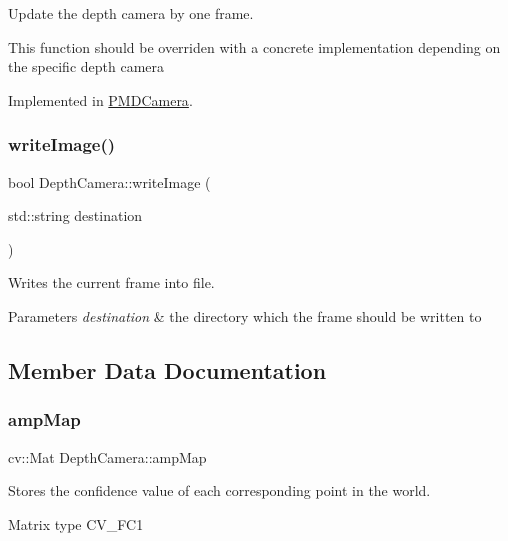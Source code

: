 Update the depth camera by one frame. 

This function should be overriden with a concrete implementation depending on the specific depth camera 

Implemented in \hyperlink{class_p_m_d_camera_aa6cb9398f9635436b4384ee2043def40}{P\+M\+D\+Camera}.

\hypertarget{class_depth_camera_a599dceaab9e673762b9ab76cf1e4f413}{}\label{class_depth_camera_a599dceaab9e673762b9ab76cf1e4f413} 
\subsubsection{\texorpdfstring{write\+Image()}{writeImage()}}
{\footnotesize\ttfamily bool Depth\+Camera\+::write\+Image (\begin{DoxyParamCaption}\item[{std\+::string}]{destination }\end{DoxyParamCaption})}



Writes the current frame into file. 


\begin{DoxyParams}{Parameters}
{\em destination} & the directory which the frame should be written to \\
\hline
\end{DoxyParams}


\subsection{Member Data Documentation}
\hypertarget{class_depth_camera_a067d5cd9eedcdaa95cc440e7381fdb9c}{}\label{class_depth_camera_a067d5cd9eedcdaa95cc440e7381fdb9c} 
\subsubsection{\texorpdfstring{amp\+Map}{ampMap}}
{\footnotesize\ttfamily cv\+::\+Mat Depth\+Camera\+::amp\+Map\hspace{0.3cm}{\ttfamily [protected]}}



Stores the confidence value of each corresponding point in the world. 

Matrix type C\+V\+\_\+F\+C1 \hypertarget{class_depth_camera_a4a2bb91ca2e9be53a53c4a6dcf0e1677}{}\label{class_depth_camera_a4a2bb91ca2e9be53a53c4a6dcf0e1677} 
